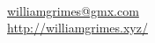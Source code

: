 \documentclass[margin,line]{resume}
\begin{document}
{
    \hfill                                                           \ \Mobilefone     \vspace{0mm}\\\vspace{0mm}%
    \hfill \href{mailto:williamgrimes@gmx.com}{williamgrimes@gmx.com} \ \Letter        \vspace{0mm}\\\vspace{0mm}%
    \hfill \url{http://williamgrimes.xyz/}                        \ \ComputerMouse \vspace{0mm}\\\vspace{-10mm}%
}
\end{document}
